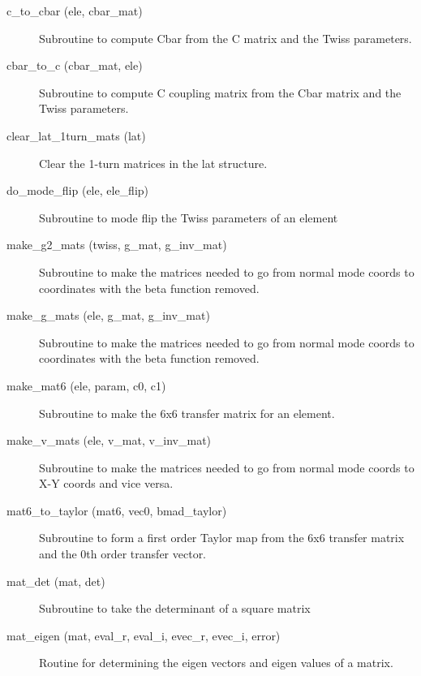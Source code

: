 \begin{description}

\item[c_to_cbar (ele, cbar_mat)] \Newline
Subroutine to compute Cbar from the C matrix and the Twiss parameters. 

\item[cbar_to_c (cbar_mat, ele)] \Newline
Subroutine to compute C coupling matrix from the Cbar matrix and the Twiss parameters. 

\item[clear_lat_1turn_mats (lat)] \Newline
Clear the 1-turn matrices in the lat structure. 

\item[do_mode_flip (ele, ele_flip)] \Newline
Subroutine to mode flip the Twiss parameters of an element 

\item[make_g2_mats (twiss, g_mat, g_inv_mat)] \Newline
Subroutine to make the matrices needed to go from normal mode coords to 
coordinates with the beta function removed. 

\item[make_g_mats (ele, g_mat, g_inv_mat)] \Newline
Subroutine to make the matrices needed to go from normal mode coords to 
coordinates with the beta function removed. 

\item[make_mat6 (ele, param, c0, c1)] \Newline
Subroutine to make the 6x6 transfer matrix for an element. 

\item[make_v_mats (ele, v_mat, v_inv_mat)] \Newline
Subroutine to make the matrices needed to go from normal mode coords to X-Y 
coords and vice versa. 

\item[mat6_to_taylor (mat6, vec0, bmad_taylor)] \Newline
Subroutine to form a first order Taylor map from the 6x6 transfer matrix 
and the 0th order transfer vector. 

\item[mat_det (mat, det)] \Newline 
     Subroutine to take the determinant of a square matrix

\item[mat_eigen (mat, eval_r, eval_i, evec_r, evec_i, error)] \Newline 
Routine for determining the eigen vectors and eigen values of a matrix.


\end{description}
